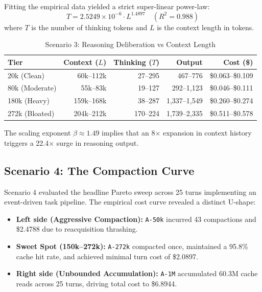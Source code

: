 \documentclass[10pt,twocolumn,a4paper]{article}
\begin{document}
Fitting the empirical data yielded a strict super-linear power-law:
\begin{equation}
T = 2.5249 \times 10^{-6} \cdot L^{1.4897} \quad (R^2 = 0.988)
\end{equation}
where $T$ is the number of thinking tokens and $L$ is the context length in tokens.

\begin{table}[t]
\caption{Scenario 3: Reasoning Deliberation vs Context Length}
\label{tab:scenario3}
\centering
\small
\begin{tabular*}{\linewidth}{@{\extracolsep{\fill}}lrrrr@{}}
\toprule
\textbf{Tier} & \textbf{Context ($L$)} & \textbf{Thinking ($T$)} & \textbf{Output} & \textbf{Cost (\$)} \\
\midrule
20k (Clean) & 60k--112k & 27--295 & 467--776 & \$0.063--\$0.109 \\
80k (Moderate) & 55k--83k & 19--127 & 292--1,123 & \$0.046--\$0.111 \\
180k (Heavy) & 159k--168k & 38--287 & 1,337--1,549 & \$0.260--\$0.274 \\
272k (Bloated) & 204k--212k & 170--224 & 1,739--2,335 & \$0.511--\$0.578 \\
\bottomrule
\end{tabular*}
\end{table}

The scaling exponent $\beta \approx 1.49$ implies that an 8$\times$ expansion in context history triggers a 22.4$\times$ surge in reasoning output.

\subsection{Scenario 4: The Compaction Curve}
Scenario 4 evaluated the headline Pareto sweep across 25 turns implementing an event-driven task pipeline. The empirical cost curve revealed a distinct U-shape:
\begin{itemize}
  \item \textbf{Left side (Aggressive Compaction):} \texttt{A-50k} incurred 43 compactions and \$2.4788 due to reacquisition thrashing.
  \item \textbf{Sweet Spot (150k--272k):} \texttt{A-272k} compacted once, maintained a 95.8\% cache hit rate, and achieved minimal turn cost of \$2.0897.
  \item \textbf{Right side (Unbounded Accumulation):} \texttt{A-1M} accumulated 60.3M cache reads across 25 turns, driving total cost to \$6.8944.
\end{itemize}
\end{document}

